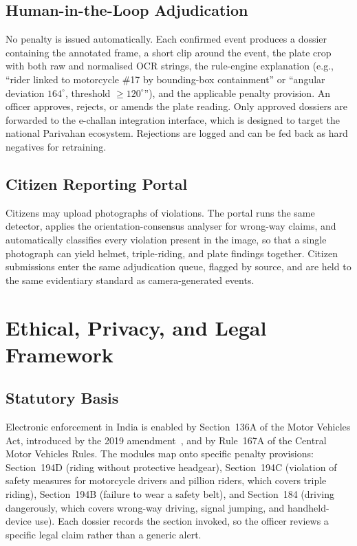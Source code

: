 \documentclass[conference]{IEEEtran}
\begin{document}
\subsection{Human-in-the-Loop Adjudication}
No penalty is issued automatically. Each confirmed event produces a dossier containing the annotated frame, a short clip around the event, the plate crop with both raw and normalised OCR strings, the rule-engine explanation (e.g., ``rider linked to motorcycle \#17 by bounding-box containment'' or ``angular deviation $164^{\circ}$, threshold $\geq 120^{\circ}$''), and the applicable penalty provision. An officer approves, rejects, or amends the plate reading. Only approved dossiers are forwarded to the e-challan integration interface, which is designed to target the national Parivahan ecosystem. Rejections are logged and can be fed back as hard negatives for retraining.

\subsection{Citizen Reporting Portal}
Citizens may upload photographs of violations. The portal runs the same detector, applies the orientation-consensus analyser for wrong-way claims, and automatically classifies every violation present in the image, so that a single photograph can yield helmet, triple-riding, and plate findings together. Citizen submissions enter the same adjudication queue, flagged by source, and are held to the same evidentiary standard as camera-generated events.

\section{Ethical, Privacy, and Legal Framework}

\subsection{Statutory Basis}
Electronic enforcement in India is enabled by Section~136A of the Motor Vehicles Act, introduced by the 2019 amendment~\cite{mvact2019}, and by Rule~167A of the Central Motor Vehicles Rules. The modules map onto specific penalty provisions: Section~194D (riding without protective headgear), Section~194C (violation of safety measures for motorcycle drivers and pillion riders, which covers triple riding), Section~194B (failure to wear a safety belt), and Section~184 (driving dangerously, which covers wrong-way driving, signal jumping, and handheld-device use). Each dossier records the section invoked, so the officer reviews a specific legal claim rather than a generic alert.
\end{document}
